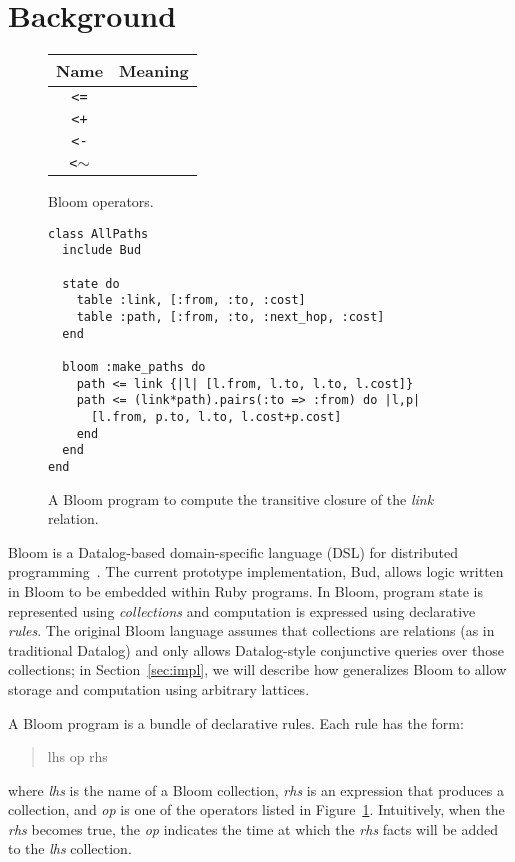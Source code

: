 \section{Background}
\label{sec:background}
\begin{figure}
\begin{tabular}{|c|l|}
\hline
Name & Meaning \\
\hline
\verb|<=| &  \\
\hline
\verb|<+| &  \\
\hline
\verb|<-| &  \\
\hline
\verb|<|$\sim$ &  \\
\hline
\end{tabular}
\caption{Bloom operators.}
\label{fig:bloom-ops}
\end{figure}

\begin{figure}[t]
\begin{scriptsize}
\begin{lstlisting}
class AllPaths
  include Bud

  state do
    table :link, [:from, :to, :cost]
    table :path, [:from, :to, :next_hop, :cost]
  end

  bloom :make_paths do
    path <= link {|l| [l.from, l.to, l.to, l.cost]}
    path <= (link*path).pairs(:to => :from) do |l,p|
      [l.from, p.to, l.to, l.cost+p.cost]
    end
  end
end
\end{lstlisting}
\end{scriptsize}
\caption{A Bloom program to compute the transitive closure of the
  \emph{link} relation.}
\label{fig:bloom-spaths}
\end{figure}

Bloom is a Datalog-based domain-specific language (DSL) for distributed
programming~\cite{Alvaro2011,bloom}. The current prototype implementation, Bud,
allows logic written in Bloom to be embedded within Ruby programs. In Bloom,
program state is represented using \emph{collections} and computation is
expressed using declarative \emph{rules}. The original Bloom language assumes
that collections are relations (as in traditional Datalog) and only allows
Datalog-style conjunctive queries over those collections; in
Section~\ref{sec:impl}, we will describe how \lang generalizes Bloom to allow
storage and computation using arbitrary lattices.

A Bloom program is a bundle of declarative rules. Each rule has the form:
\begin{quotation}
lhs op rhs
\end{quotation}
where \emph{lhs} is the name of a Bloom collection, \emph{rhs} is an expression
that produces a collection, and \emph{op} is one of the operators listed in
Figure~\ref{fig:bloom-ops}. Intuitively, when the \emph{rhs} becomes true, the
\emph{op} indicates the time at which the \emph{rhs} facts will be added to the
\emph{lhs} collection.

